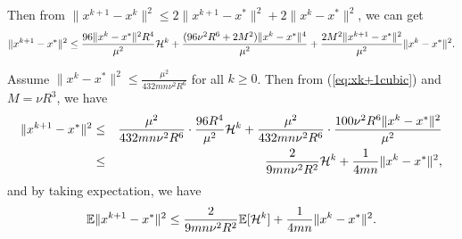 \documentclass[10pt]{article}
\begin{document}
Then from $\|x^{k+1} - x^k\|^2 \leq 2\|x^{k+1} - x^*\|^2 + 2\|x^k - x^*\|^2$, we can get 
\begin{equation}\label{eq:xk+1cubic}
\|x^{k+1} - x^*\|^2 \leq \frac{96\|x^k - x^*\|^2 R^4}{\mu^2}{\cal H}^k + \frac{(96\nu^2 R^6 + 2M^2) \|x^k - x^*\|^4 }{\mu^2} + \frac{2M^2\|x^{k+1} - x^*\|^2}{\mu^2} \| x^k - x^* \|^2. 
\end{equation}


Assume $\|x^k - x^*\|^2 \leq \frac{\mu^2}{432m n \nu^2R^6}$ for all $k\geq 0$. Then from (\ref{eq:xk+1cubic}) and $M=\nu R^3$, we have 
\begin{eqnarray*}
	\|x^{k+1} - x^*\|^2 &\leq& \frac{\mu^2}{432mn\nu^2 R^6} \cdot \frac{96R^4}{\mu^2}{\cal H}^k + \frac{\mu^2}{432mn\nu^2 R^6} \cdot \frac{ 100\nu^2 R^6\|x^k-x^*\|^2}{\mu^2} \\ 
	&\leq& \frac{2}{9mn \nu^2 R^2} {\cal H}^k + \frac{1}{4mn} \|x^k - x^*\|^2, 
\end{eqnarray*}
and by taking expectation, we have 
\begin{equation}\label{eq:expxk+1-cubic}
\mathbb{E}\|x^{k+1} - x^*\|^2 \leq  \frac{2}{9mn \nu^2 R^2} \mathbb{E}[{\cal H}^k] + \frac{1}{4mn} \|x^k - x^*\|^2. 
\end{equation}
\end{document}
